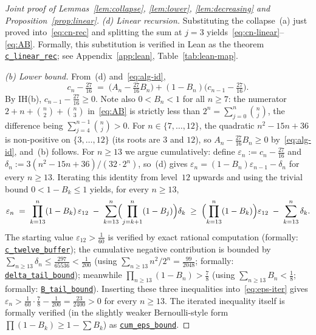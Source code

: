 \documentclass[12pt]{article}
\theoremstyle{definition}
\theoremstyle{remark}
\begin{document}
\begin{proof}[Joint proof of Lemmas~\ref{lem:collapse},
  \ref{lem:lower}, \ref{lem:decreasing} and Proposition~\ref{prop:linear}]
  \emph{(d) Linear recursion.}  Substituting the collapse~(a)
  just proved into~\eqref{eq:cn-rec} and splitting the sum at $j=3$
  yields~\eqref{eq:cn-linear}--\eqref{eq:AB}.  Formally, this
  substitution is verified in Lean as the theorem
  \href{https://github.com/pfaffelh/coins/blob/c60bcd3/CoinsLean/CoinsLean/Perturbation.lean\#L1495}{\texttt{c\_linear\_rec}};
  see Appendix~\ref{app:lean}, Table~\ref{tab:lean-map}.

  \emph{(b) Lower bound.}  From~(d) and~\eqref{eq:alg-id},
  \[
    c_n - \tfrac{27}{16}
    \;=\; \bigl(A_n-\tfrac{27}{16}B_n\bigr)
        + (1-B_n)\bigl(c_{n-1}-\tfrac{27}{16}\bigr).
  \]
  By IH(b), $c_{n-1}-\tfrac{27}{16}\ge 0$.  Note also
  $0<B_n<1$ for all $n\ge 7$: the numerator
  $2+n+\binom{n}{2}+\binom{n}{3}$ in~\eqref{eq:AB} is strictly
  less than $2^n=\sum_{j=0}^n\binom{n}{j}$, the difference being
  $\sum_{j=4}^{n-1}\binom{n}{j}>0$.  For $n\in\{7,\dots,12\}$, the
  quadratic $n^2-15n+36$ is non-positive on $\{3,\dots,12\}$
  (its roots are $3$ and $12$), so $A_n-\tfrac{27}{16}B_n\ge 0$
  by~\eqref{eq:alg-id}, and~(b) follows.  For $n\ge 13$ we argue
  cumulatively: define $\varepsilon_n:=c_n-\tfrac{27}{16}$ and
  $\delta_n:=3(n^2-15n+36)/(32\cdot 2^n)$,
  so~(d) gives $\varepsilon_n=(1-B_n)\varepsilon_{n-1}-\delta_n$
  for every $n\ge 13$.  Iterating this identity from level~$12$
  upwards and using the trivial bound $0<1-B_k\le 1$ yields, for
  every $n\ge 13$,
  \begin{equation}\label{eq:eps-iter}
    \varepsilon_n
    \;=\; \prod_{k=13}^{n}(1-B_k)\,\varepsilon_{12}
    \;-\; \sum_{k=13}^{n}\!\Bigl(\prod_{j=k+1}^{n}(1-B_j)\Bigr)\delta_k
    \;\ge\; \Bigl(\prod_{k=13}^{n}(1-B_k)\Bigr)\varepsilon_{12}
            \;-\; \sum_{k=13}^{n}\delta_k.
  \end{equation}
  The starting value $\varepsilon_{12}>\tfrac{1}{60}$ is verified by
  exact rational computation (formally:
  \href{https://github.com/pfaffelh/coins/blob/c60bcd3/CoinsLean/CoinsLean/Perturbation.lean\#L2995}{\texttt{c\_twelve\_buffer}});
  the cumulative negative contribution is bounded by
  $\sum_{n\ge 13}\delta_n \le\tfrac{297}{65536}<\tfrac{1}{200}$
  (using $\sum_{n\ge 13}n^2/2^n=\tfrac{99}{2048}$; formally:
  \href{https://github.com/pfaffelh/coins/blob/c60bcd3/CoinsLean/CoinsLean/Perturbation.lean\#L889}{\texttt{delta\_tail\_bound}});
  meanwhile $\prod_{n\ge 13}(1-B_n)>\tfrac{7}{8}$ (using
  $\sum_{n\ge 13}B_n<\tfrac{1}{8}$; formally:
  \href{https://github.com/pfaffelh/coins/blob/c60bcd3/CoinsLean/CoinsLean/Perturbation.lean\#L864}{\texttt{B\_tail\_bound}}).
  Inserting these three inequalities into~\eqref{eq:eps-iter} gives
  $\varepsilon_n>\tfrac{1}{60}\cdot\tfrac{7}{8}-\tfrac{1}{200}
  =\tfrac{23}{2400}>0$ for every $n\ge 13$.  The iterated inequality
  itself is formally verified (in the slightly weaker
  Bernoulli-style form
  $\prod(1-B_k)\ge 1-\sum B_k$) as
  \href{https://github.com/pfaffelh/coins/blob/c60bcd3/CoinsLean/CoinsLean/Perturbation.lean\#L949}{\texttt{cum\_eps\_bound}}.


\end{proof}
\end{document}
